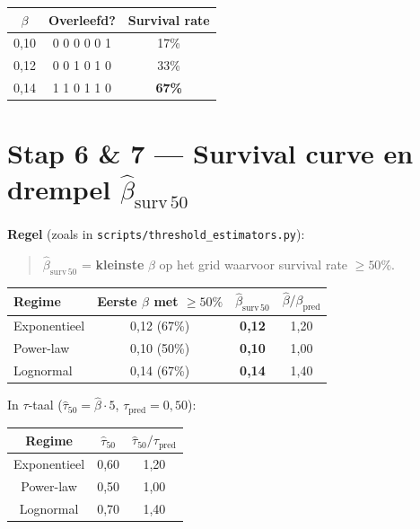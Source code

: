 \documentclass[11pt,a4paper]{article}
\begin{document}
\begin{center}
\begin{tabular}{@{}ccc@{}}
\toprule
$\beta$ & Overleefd? & Survival rate \\
\midrule
0,10 & 0 0 0 0 0 1 & 17\% \\
0,12 & 0 0 1 0 1 0 & 33\% \\
0,14 & 1 1 0 1 1 0 & \textbf{67\%} \\
\bottomrule
\end{tabular}
\end{center}

\section{Stap 6 \& 7 --- Survival curve en drempel $\hat\beta_{\mathrm{surv}\,50}$}

\textbf{Regel} (zoals in \texttt{scripts/threshold\_estimators.py}):

\begin{quote}
$\hat\beta_{\mathrm{surv}\,50}$ = \textbf{kleinste} $\beta$ op het grid waarvoor survival rate $\ge 50\%$.
\end{quote}

\begin{center}
\begin{tabular}{@{}lccc@{}}
\toprule
Regime & Eerste $\beta$ met $\ge 50\%$ & $\hat\beta_{\mathrm{surv}\,50}$ & $\hat\beta / \beta_{\mathrm{pred}}$ \\
\midrule
Exponentieel & 0,12 (67\%) & \textbf{0,12} & 1,20 \\
Power-law & 0,10 (50\%) & \textbf{0,10} & 1,00 \\
Lognormal & 0,14 (67\%) & \textbf{0,14} & 1,40 \\
\bottomrule
\end{tabular}
\end{center}

In $\tau$-taal ($\hat\tau_{50} = \hat\beta \cdot 5$, $\tau_{\mathrm{pred}} = 0{,}50$):

\begin{center}
\begin{tabular}{@{}ccc@{}}
\toprule
Regime & $\hat\tau_{50}$ & $\hat\tau_{50}/\tau_{\mathrm{pred}}$ \\
\midrule
Exponentieel & 0,60 & 1,20 \\
Power-law & 0,50 & 1,00 \\
Lognormal & 0,70 & 1,40 \\
\bottomrule
\end{tabular}
\end{center}
\end{document}
